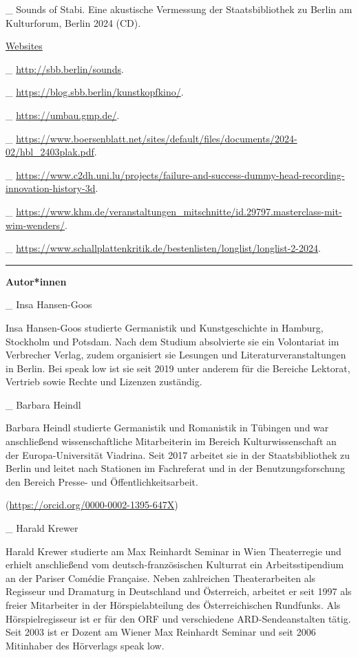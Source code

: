 \documentclass[a4paper,
fontsize=11pt,
oneside,
numbers=noperiodatend,
parskip=half-,
bibliography=totoc,
final
]{scrartcl}
\begin{document}
\_ Sounds of Stabi. Eine akustische Vermessung der Staatsbibliothek zu
Berlin am Kulturforum, Berlin 2024 (CD).

\underline{Websites}

\_ \url{http://sbb.berlin/sounds}.

\_ \url{https://blog.sbb.berlin/kunstkopfkino/}.

\_ \url{https://umbau.gmp.de/}.

\_
\url{https://www.boersenblatt.net/sites/default/files/documents/2024-02/hbl_2403plak.pdf}.

\_
\url{https://www.c2dh.uni.lu/projects/failure-and-success-dummy-head-recording-innovation-history-3d}.

\_
\url{https://www.khm.de/veranstaltungen_mitschnitte/id.29797.masterclass-mit-wim-wenders/}.

\_
\url{https://www.schallplattenkritik.de/bestenlisten/longlist/longlist-2-2024}.

\begin{center}\rule{0.5\linewidth}{0.5pt}\end{center}

\textbf{Autor*innen}

\_ Insa Hansen-Goos

Insa Hansen-Goos studierte Germanistik und Kunstgeschichte in Hamburg,
Stockholm und Potsdam. Nach dem Studium absolvierte sie ein Volontariat
im Verbrecher Verlag, zudem organisiert sie Lesungen und
Literaturveranstaltungen in Berlin. Bei speak low ist sie seit 2019
unter anderem für die Bereiche Lektorat, Vertrieb sowie Rechte und
Lizenzen zuständig.

\_ Barbara Heindl

Barbara Heindl studierte Germanistik und Romanistik in Tübingen und war
anschließend wissenschaftliche Mitarbeiterin im Bereich
Kulturwissenschaft an der Europa-Universität Viadrina. Seit 2017
arbeitet sie in der Staatsbibliothek zu Berlin und leitet nach Stationen
im Fachreferat und in der Benutzungsforschung den Bereich Presse- und
Öffentlichkeitsarbeit.

(\url{https://orcid.org/0000-0002-1395-647X})

\_ Harald Krewer

Harald Krewer studierte am Max Reinhardt Seminar in Wien Theaterregie
und erhielt anschließend vom deutsch-französischen Kulturrat ein
Arbeitsstipendium an der Pariser Comédie Française. Neben zahlreichen
Theaterarbeiten als Regisseur und Dramaturg in Deutschland und
Österreich, arbeitet er seit 1997 als freier Mitarbeiter in der
Hörspielabteilung des Österreichischen Rundfunks. Als Hörspielregisseur
ist er für den ORF und verschiedene ARD-Sendeanstalten tätig. Seit 2003
ist er Dozent am Wiener Max Reinhardt Seminar und seit 2006 Mitinhaber
des Hörverlags speak low.
\end{document}
